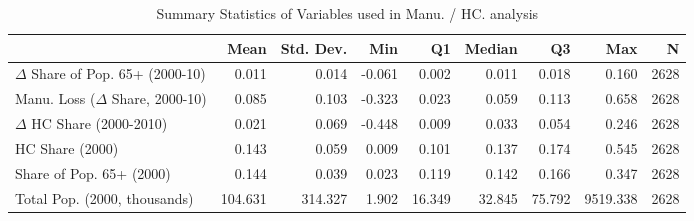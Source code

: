 \begin{table}[htbp]
\caption{Summary Statistics of Variables used in Manu. / HC. analysis}
\label{tab:summary_stats}
\begin{adjustbox}{max width=\textwidth}
\begin{tabular}{lrrrrrrrr}
\toprule
 & Mean & Std. Dev. & Min & Q1 & Median & Q3 & Max & N \\
\midrule
$\Delta$ Share of Pop. 65+ (2000-10) & 0.011 & 0.014 & -0.061 & 0.002 & 0.011 & 0.018 & 0.160 & 2628 \\
Manu. Loss ($\Delta$ Share, 2000-10) & 0.085 & 0.103 & -0.323 & 0.023 & 0.059 & 0.113 & 0.658 & 2628 \\
$\Delta$ HC Share (2000-2010) & 0.021 & 0.069 & -0.448 & 0.009 & 0.033 & 0.054 & 0.246 & 2628 \\
HC Share (2000) & 0.143 & 0.059 & 0.009 & 0.101 & 0.137 & 0.174 & 0.545 & 2628 \\
Share of Pop. 65+ (2000) & 0.144 & 0.039 & 0.023 & 0.119 & 0.142 & 0.166 & 0.347 & 2628 \\
 Total Pop. (2000, thousands) & 104.631 & 314.327 & 1.902 & 16.349 & 32.845 & 75.792 & 9519.338 & 2628 \\
\bottomrule
\end{tabular}
\end{adjustbox}
\end{table}
